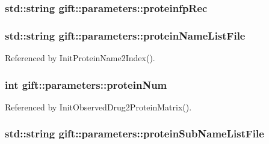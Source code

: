 \subsubsection[{\texorpdfstring{proteinfp\+Rec}{proteinfpRec}}]{\setlength{\rightskip}{0pt plus 5cm}std\+::string gift\+::parameters\+::proteinfp\+Rec}\hypertarget{classgift_1_1parameters_a97ed4f530fac84c7c981f4c4056dc1b1}{}\label{classgift_1_1parameters_a97ed4f530fac84c7c981f4c4056dc1b1}
\subsubsection[{\texorpdfstring{protein\+Name\+List\+File}{proteinNameListFile}}]{\setlength{\rightskip}{0pt plus 5cm}std\+::string gift\+::parameters\+::protein\+Name\+List\+File}\hypertarget{classgift_1_1parameters_aaa3fbb7fb15202e1c87b3e93ce5b5e03}{}\label{classgift_1_1parameters_aaa3fbb7fb15202e1c87b3e93ce5b5e03}


Referenced by Init\+Protein\+Name2\+Index().

\subsubsection[{\texorpdfstring{protein\+Num}{proteinNum}}]{\setlength{\rightskip}{0pt plus 5cm}int gift\+::parameters\+::protein\+Num}\hypertarget{classgift_1_1parameters_a0a91cd09e0a7f8a7f52e8aca1a832140}{}\label{classgift_1_1parameters_a0a91cd09e0a7f8a7f52e8aca1a832140}


Referenced by Init\+Observed\+Drug2\+Protein\+Matrix().

\subsubsection[{\texorpdfstring{protein\+Sub\+Name\+List\+File}{proteinSubNameListFile}}]{\setlength{\rightskip}{0pt plus 5cm}std\+::string gift\+::parameters\+::protein\+Sub\+Name\+List\+File}\hypertarget{classgift_1_1parameters_a24da583f5d710acc0db17a6e712adcdd}{}\label{classgift_1_1parameters_a24da583f5d710acc0db17a6e712adcdd}


